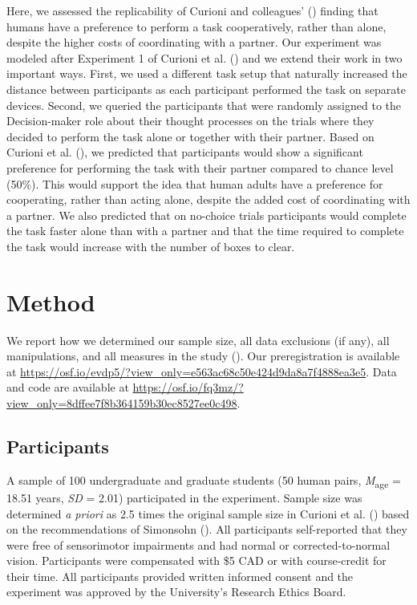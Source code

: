 \documentclass[
  man,
  floatsintext,
  longtable,
  nolmodern,
  notxfonts,
  notimes,
  mask,
  colorlinks=true,linkcolor=blue,citecolor=blue,urlcolor=blue]{apa7}
\begin{document}
Here, we assessed the replicability of Curioni and colleagues'
() finding that humans have a preference
to perform a task cooperatively, rather than alone, despite the higher
costs of coordinating with a partner. Our experiment was modeled after
Experiment 1 of Curioni et al. () and we
extend their work in two important ways. First, we used a different task
setup that naturally increased the distance between participants as each
participant performed the task on separate devices. Second, we queried
the participants that were randomly assigned to the Decision-maker role
about their thought processes on the trials where they decided to
perform the task alone or together with their partner. Based on Curioni
et al. (), we predicted that
participants would show a significant preference for performing the task
with their partner compared to chance level (50\%). This would support
the idea that human adults have a preference for cooperating, rather
than acting alone, despite the added cost of coordinating with a
partner. We also predicted that on no-choice trials participants would
complete the task faster alone than with a partner and that the time
required to complete the task would increase with the number of boxes to
clear.

\section{Method}\label{method}

We report how we determined our sample size, all data exclusions (if
any), all manipulations, and all measures in the study
(). Our preregistration
is available at
\url{https://osf.io/evdp5/?view_only=e563ac68c50e424d9da8a7f4888ea3e5}.
Data and code are available at
\url{https://osf.io/fq3mz/?view_only=8dffee7f8b364159b30ec8527ee0c498}.

\subsection{Participants}\label{participants}

A sample of 100 undergraduate and graduate students (50 human pairs,
\emph{M}\textsubscript{age} = 18.51 years, \emph{SD} = 2.01)
participated in the experiment. Sample size was determined \emph{a
priori} as 2.5 times the original sample size in Curioni et al.
() based on the recommendations of
Simonsohn (). All participants
self-reported that they were free of sensorimotor impairments and had
normal or corrected-to-normal vision. Participants were compensated with
\$5 CAD or with course-credit for their time. All participants provided
written informed consent and the experiment was approved by the
University's Research Ethics Board.
\end{document}
